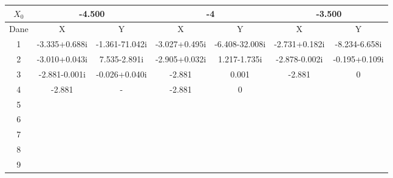 \documentclass[a4paper, 11pt]{article}
\begin{document}
\begin{enumerate}
\begin{itemize}
\begin{table}[p]
\begin{tabular}{|c|c|c|c|c|c|c|}
\( X_0 \)  & \multicolumn{2}{c|}{-4.500} & \multicolumn{2}{c|}{ -4 } &\multicolumn{2}{c|}{ -3.500 } \\                                              
\hline                                                                                                    
Dane & X & Y & X & Y & X & Y \\                                                                          
\hline                                                                                                    
1  & -3.335+0.688i & -1.361-71.042i & -3.027+0.495i & -6.408-32.008i & -2.731+0.182i & -8.234-6.658i \\
\hline                                                                                                    
2  & -3.010+0.043i & 7.535-2.891i & -2.905+0.032i & 1.217-1.735i & -2.878-0.002i & -0.195+0.109i \\    
\hline                                                                                                    
3  & -2.881-0.001i & -0.026+0.040i & -2.881  & 0.001  & -2.881  & 0 \\    
\hline                                                                                                    
4  & -2.881  & -  & -2.881  & 0  &  &  \\                  
\hline                                                                                                    
5  &  &  &  &  &  &  \\                                                  
\hline                                                                                                    
6  &  &  &  &  &  &  \\                                                  
\hline                                                                                                    
7  &  &  &  &  &  &  \\                                                  
\hline                                                                                                    
8  &  &  &  &  &  &  \\                                                  
\hline                                                                                                    
9  &  &  &  &  &  &  \\                                                  
\hline                                                                                                    
\end{tabular}                                                                                             

\end{table}
\end{itemize}
\end{enumerate}
\end{document}
